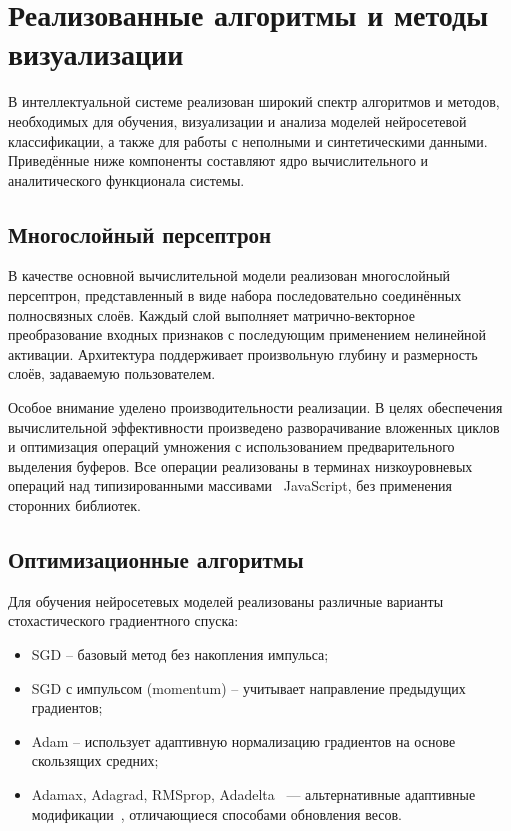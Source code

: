 \section{Реализованные алгоритмы и методы визуализации}

В интеллектуальной системе реализован широкий спектр алгоритмов и методов, необходимых для обучения, визуализации и анализа моделей нейросетевой классификации, а также для работы с неполными и синтетическими данными. Приведённые ниже компоненты составляют ядро вычислительного и аналитического функционала системы.

\subsection{Многослойный персептрон}
В качестве основной вычислительной модели реализован многослойный персептрон, представленный в виде набора последовательно соединённых полносвязных слоёв. Каждый слой выполняет матрично-векторное преобразование входных признаков с последующим применением нелинейной активации. Архитектура поддерживает произвольную глубину и размерность слоёв, задаваемую пользователем.

Особое внимание уделено производительности реализации. В целях обеспечения вычислительной эффективности произведено разворачивание вложенных циклов~\cite{huang1999generalized} и оптимизация операций умножения с использованием предварительного выделения буферов. Все операции реализованы в терминах низкоуровневых операций над типизированными массивами~\cite{matsakis2014typed} JavaScript, без применения сторонних библиотек.

\subsection{Оптимизационные алгоритмы}
Для обучения нейросетевых моделей реализованы различные варианты стохастического градиентного спуска:

\begin{itemize}
    \item SGD -- базовый метод без накопления импульса;
    \item SGD с импульсом (momentum) -- учитывает направление предыдущих градиентов;
    \item Adam -- использует адаптивную нормализацию градиентов на основе скользящих средних;
    \item Adamax, Adagrad, RMSprop, Adadelta~\cite{zeiler2012adadelta} — альтернативные адаптивные модификации~\cite{ruder2016overview}, отличающиеся способами обновления весов.
\end{itemize}

